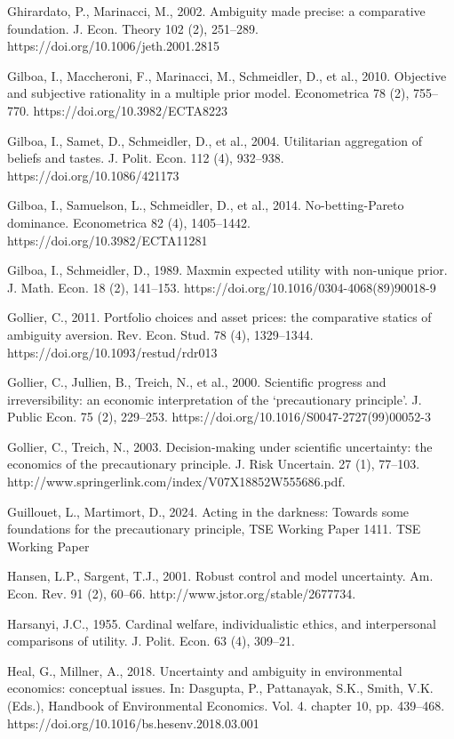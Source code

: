 \documentclass[12pt,a4paper]{article}
\newenvironment{original}
  {\par\noindent\ignorespaces}
  {\par}
\begin{document}
\begin{original}
Ghirardato, P., Marinacci, M., 2002. Ambiguity made precise: a comparative foundation. J. Econ. Theory 102 (2), 251--289. https://doi.org/10.1006/jeth.2001.2815

Gilboa, I., Maccheroni, F., Marinacci, M., Schmeidler, D., et al., 2010. Objective and subjective rationality in a multiple prior model. Econometrica 78 (2), 755--770. https://doi.org/10.3982/ECTA8223

Gilboa, I., Samet, D., Schmeidler, D., et al., 2004. Utilitarian aggregation of beliefs and tastes. J. Polit. Econ. 112 (4), 932--938. https://doi.org/10.1086/421173

Gilboa, I., Samuelson, L., Schmeidler, D., et al., 2014. No-betting-Pareto dominance. Econometrica 82 (4), 1405--1442. https://doi.org/10.3982/ECTA11281

Gilboa, I., Schmeidler, D., 1989. Maxmin expected utility with non-unique prior. J. Math. Econ. 18 (2), 141--153. https://doi.org/10.1016/0304-4068(89)90018-9

Gollier, C., 2011. Portfolio choices and asset prices: the comparative statics of ambiguity aversion. Rev. Econ. Stud. 78 (4), 1329--1344. https://doi.org/10.1093/restud/rdr013

Gollier, C., Jullien, B., Treich, N., et al., 2000. Scientific progress and irreversibility: an economic interpretation of the `precautionary principle'. J. Public Econ. 75 (2), 229--253. https://doi.org/10.1016/S0047-2727(99)00052-3

Gollier, C., Treich, N., 2003. Decision-making under scientific uncertainty: the economics of the precautionary principle. J. Risk Uncertain. 27 (1), 77--103. http://www.springerlink.com/index/V07X18852W555686.pdf.

Guillouet, L., Martimort, D., 2024. Acting in the darkness: Towards some foundations for the precautionary principle, TSE Working Paper 1411. TSE Working Paper

Hansen, L.P., Sargent, T.J., 2001. Robust control and model uncertainty. Am. Econ. Rev. 91 (2), 60--66. http://www.jstor.org/stable/2677734.

Harsanyi, J.C., 1955. Cardinal welfare, individualistic ethics, and interpersonal comparisons of utility. J. Polit. Econ. 63 (4), 309--21.

Heal, G., Millner, A., 2018. Uncertainty and ambiguity in environmental economics: conceptual issues. In: Dasgupta, P., Pattanayak, S.K., Smith, V.K. (Eds.), Handbook of Environmental Economics. Vol. 4. chapter 10, pp. 439--468. https://doi.org/10.1016/bs.hesenv.2018.03.001


\end{original}
\end{document}
